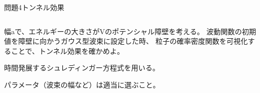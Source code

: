 \documentclass[dvipdfmx]{beamer}
\newenvironment{wideitemize}{\itemize\setlength{\itemsep}{1em}}{\enditemize}
\newenvironment{wideitemize2}{\itemize\setlength{\itemsep}{0.2em}}{\enditemize}
\begin{document}

\begin{frame}{問題4}{トンネル効果}
\begin{columns}[t]
\begin{column}{0.7\textwidth}
\begin{wideitemize}
	\item 幅aで、エネルギーの大きさがVのポテンシャル障壁を考える。
	波動関数の初期値を障壁に向かうガウス型波束に設定した時、
	粒子の確率密度関数を可視化することで、トンネル効果を確かめよ。
	\begin{wideitemize2}
		\item 時間発展するシュレディンガー方程式を用いる。
		\item パラメータ（波束の幅など）は適当に選ぶこと。
	\end{wideitemize2}

\end{wideitemize}


\end{column}
\end{columns}
\end{frame}
\end{document}
